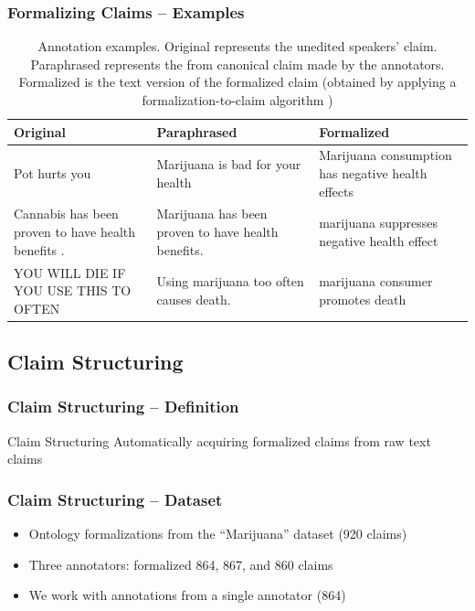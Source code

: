 \documentclass{beamer}
\begin{document}
\begin{frame}
\frametitle{Formalizing Claims -- Examples}

\begin{table}[t]

\renewcommand{\arraystretch}{1.5} %
	\scriptsize
	\begin{tabular}{p{3cm}|p{3.5cm}|p{3.5cm}}
	\toprule
Original & Paraphrased & Formalized \\
\midrule
Pot hurts you & Marijuana is bad for your health & Marijuana consumption has negative health effects \\

Cannabis has been proven to have health benefits . & 
Marijuana has been proven to have health benefits. & 
marijuana suppresses negative health effect \\

YOU WILL DIE IF YOU USE THIS TO OFTEN &                                                                     
Using marijuana too often causes death. &                                                                                                                                                     
marijuana consumer promotes death \\                                                         
\bottomrule
\end{tabular}
\caption{Annotation examples. Original represents the unedited speakers' claim.
	Paraphrased represents the from canonical claim made by the annotators.
	Formalized is the text version  of the formalized claim (obtained by
	applying a formalization-to-claim algorithm )
	}
\end{table}

\end{frame}

\subsection{Claim Structuring}

\begin{frame}
\frametitle{Claim Structuring -- Definition}

\begin{block}{Claim Structuring}
Automatically acquiring formalized claims from raw text claims
\end{block}

\end{frame}

\begin{frame}
	\frametitle{Claim Structuring -- Dataset}

	\begin{itemize}
		\item Ontology formalizations from the ``Marijuana'' dataset (920 claims)
		\item Three annotators: formalized 864, 867, and 860 claims
		\item We work with annotations from a single annotator (864)
	\end{itemize}
\end{frame}
\end{document}
